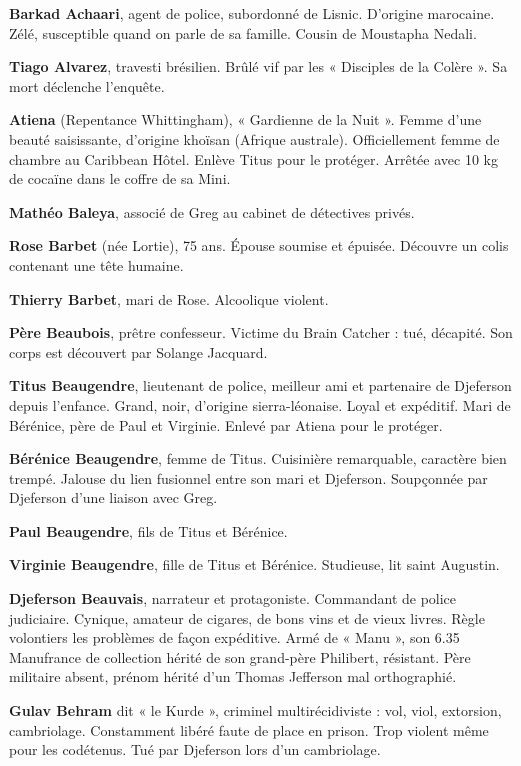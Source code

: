 \textbf{Barkad Achaari}, agent de police, subordonné de Lisnic. D'origine marocaine. Zélé, susceptible quand on parle de sa famille. Cousin de Moustapha Nedali.

\textbf{Tiago Alvarez}, travesti brésilien. Brûlé vif par les « Disciples de la Colère ». Sa mort déclenche l'enquête.

\textbf{Atiena} (Repentance Whittingham), « Gardienne de la Nuit ». Femme d'une beauté saisissante, d'origine khoïsan (Afrique australe). Officiellement femme de chambre au Caribbean Hôtel. Enlève Titus pour le protéger. Arrêtée avec 10 kg de cocaïne dans le coffre de sa Mini.

\textbf{Mathéo Baleya}, associé de Greg au cabinet de détectives privés.

\textbf{Rose Barbet} (née Lortie), 75 ans. Épouse soumise et épuisée. Découvre un colis contenant une tête humaine.

\textbf{Thierry Barbet}, mari de Rose. Alcoolique violent.

\textbf{Père Beaubois}, prêtre confesseur. Victime du Brain Catcher : tué, décapité. Son corps est découvert par Solange Jacquard.

\textbf{Titus Beaugendre}, lieutenant de police, meilleur ami et partenaire de Djeferson depuis l'enfance. Grand, noir, d'origine sierra-léonaise. Loyal et expéditif. Mari de Bérénice, père de Paul et Virginie. Enlevé par Atiena pour le protéger.

\textbf{Bérénice Beaugendre}, femme de Titus. Cuisinière remarquable, caractère bien trempé. Jalouse du lien fusionnel entre son mari et Djeferson. Soupçonnée par Djeferson d'une liaison avec Greg.

\textbf{Paul Beaugendre}, fils de Titus et Bérénice.

\textbf{Virginie Beaugendre}, fille de Titus et Bérénice. Studieuse, lit saint Augustin.

\textbf{Djeferson Beauvais}, narrateur et protagoniste. Commandant de police judiciaire. Cynique, amateur de cigares, de bons vins et de vieux livres. Règle volontiers les problèmes de façon expéditive. Armé de « Manu », son 6.35 Manufrance de collection hérité de son grand-père Philibert, résistant. Père militaire absent, prénom hérité d'un Thomas Jefferson mal orthographié.

\textbf{Gulav Behram} dit « le Kurde », criminel multirécidiviste : vol, viol, extorsion, cambriolage. Constamment libéré faute de place en prison. Trop violent même pour les codétenus. Tué par Djeferson lors d'un cambriolage.

